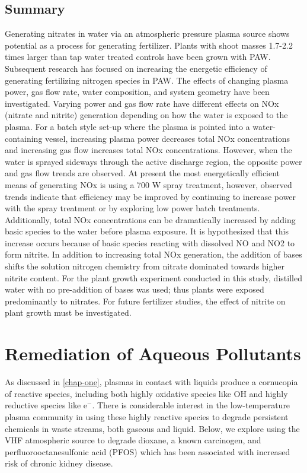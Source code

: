 \subsection{Summary}

Generating nitrates in water via an atmospheric pressure plasma source shows potential as a process for generating fertilizer.  Plants with shoot masses 1.7-2.2 times larger than tap water treated controls have been grown with PAW.  Subsequent research has focused on increasing the energetic efficiency of generating fertilizing nitrogen species in PAW.  The effects of changing plasma power, gas flow rate, water composition, and system geometry have been investigated.  Varying power and gas flow rate have different effects on NOx (nitrate and nitrite) generation depending on how the water is exposed to the plasma.  For a batch style set-up where the plasma is pointed into a water-containing vessel, increasing plasma power decreases total NOx concentrations and increasing gas flow increases total NOx concentrations.  However, when the water is sprayed sideways through the active discharge region, the opposite power and gas flow trends are observed.  At present the most energetically efficient means of generating NOx is using a 700 W spray treatment, however, observed trends indicate that efficiency may be improved by continuing to increase power with the spray treatment or by exploring low power batch treatments.   Additionally, total NOx concentrations can be dramatically increased by adding basic species to the water before plasma exposure.  It is hypothesized that this increase occurs because of basic species reacting with dissolved NO and NO2 to form nitrite.  In addition to increasing total NOx generation, the addition of bases shifts the solution nitrogen chemistry from nitrate dominated towards higher nitrite content.  For the plant growth experiment conducted in this study, distilled water with no pre-addition of bases was used; thus plants were exposed predominantly to nitrates.  For future fertilizer studies, the effect of nitrite on plant growth must be investigated.

\section{Remediation of Aqueous Pollutants}

As discussed in \cref{chap-one}, plasmas in contact with liquids produce a cornucopia of reactive species, including both highly oxidative species like OH and highly reductive species like e$^-$. There is considerable interest in the low-temperature plasma community in using these highly reactive species to degrade persistent chemicals in waste streams, both gaseous and liquid. Below, we explore using the VHF atmospheric source to degrade dioxane, a known carcinogen, and perfluorooctanesulfonic acid (PFOS) which has been associated with increased risk of chronic kidney disease. \cite{shankar2011perfluoroalkyl}

